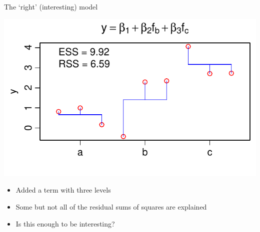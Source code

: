 \documentclass[xcolor=x11names,compress]{beamer}
\renewcommand{\(}{\begin{columns}}
\renewcommand{\)}{\end{columns}}
\newcommand{\<}[1]{\begin{column}{#1}}
\renewcommand{\>}{\end{column}}
\begin{document}
\begin{frame}{The `right' (interesting) model}

    \centerline{\includegraphics[height=0.5\textheight]{Intermediate.pdf}}

    \begin{itemize}\itemsep6pt
    \item Added a term with three levels
    \item Some but not all of the residual sums of squares are explained
    \item Is this enough to be interesting?
    \end{itemize}		

\end{frame}
\end{document}
